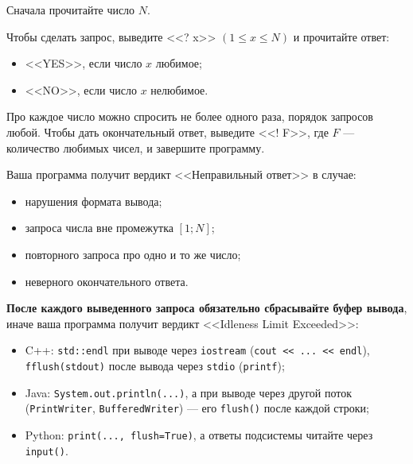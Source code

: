 Сначала прочитайте число $N$.

Чтобы сделать запрос, выведите <<? x>> $(1 \le x \le N)$ и прочитайте ответ:

\begin{itemize}
\item <<YES>>, если число $x$ любимое;
\item <<NO>>, если число $x$ нелюбимое.
\end{itemize}

Про каждое число можно спросить не более одного раза, порядок запросов любой. Чтобы дать окончательный ответ, выведите <<! F>>, где $F$ --- количество любимых чисел, и завершите программу.

Ваша программа получит вердикт <<Неправильный ответ>> в случае:

\begin{itemize}
\item нарушения формата вывода;
\item запроса числа вне промежутка $[1; N]$;
\item повторного запроса про одно и то же число;
\item неверного окончательного ответа.
\end{itemize}

\textbf{После каждого выведенного запроса обязательно сбрасывайте буфер вывода}, иначе ваша программа получит вердикт <<Idleness Limit Exceeded>>:

\begin{itemize}
\item C++: \texttt{std::endl} при выводе через \texttt{iostream} (\texttt{cout << ... << endl}), \texttt{fflush(stdout)} после вывода через \texttt{stdio} (\texttt{printf});
\item Java: \texttt{System.out.println(...)}, а при выводе через другой поток (\texttt{PrintWriter}, \texttt{BufferedWriter}) --- его \texttt{flush()} после каждой строки;
\item Python: \texttt{print(..., flush=True)}, а ответы подсистемы читайте через \texttt{input()}.
\end{itemize}
